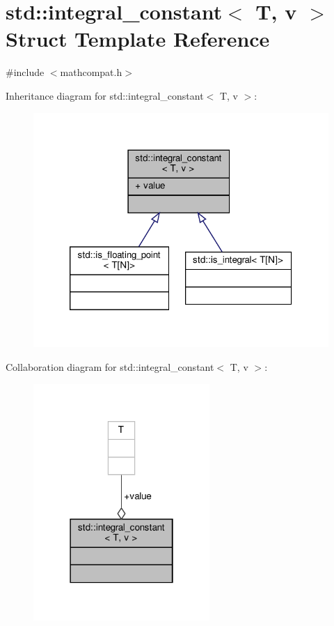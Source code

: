 \hypertarget{structstd_1_1integral__constant}{}\section{std\+:\+:integral\+\_\+constant$<$ T, v $>$ Struct Template Reference}
\label{structstd_1_1integral__constant}


{\ttfamily \#include $<$mathcompat.\+h$>$}



Inheritance diagram for std\+:\+:integral\+\_\+constant$<$ T, v $>$\+:\nopagebreak
\begin{figure}[H]
\begin{center}
\leavevmode
\includegraphics[width=320pt]{dd/dd3/structstd_1_1integral__constant__inherit__graph}
\end{center}
\end{figure}


Collaboration diagram for std\+:\+:integral\+\_\+constant$<$ T, v $>$\+:\nopagebreak
\begin{figure}[H]
\begin{center}
\leavevmode
\includegraphics[width=190pt]{df/d33/structstd_1_1integral__constant__coll__graph}
\end{center}
\end{figure}
